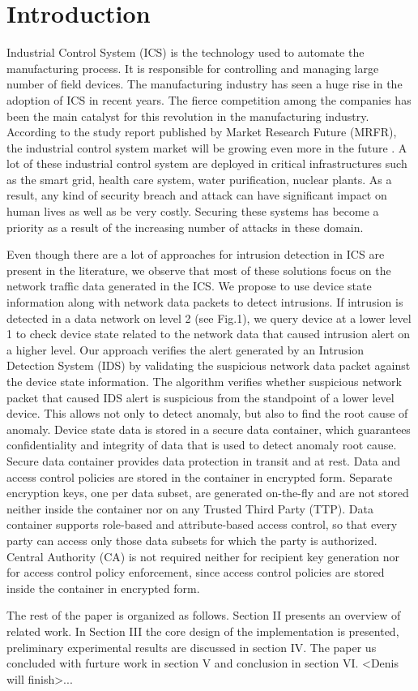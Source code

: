 \documentclass[conference]{IEEEtran}
\begin{document}
\section{Introduction}
Industrial Control System (ICS) is the technology used to automate the manufacturing process. It is responsible for controlling and managing large number of field devices. The manufacturing industry has seen a huge rise in the adoption of ICS in recent years. The fierce competition among the companies has been the main catalyst for this revolution in the manufacturing industry. According to the study report published by  Market Research Future (MRFR), the industrial control system market will be growing even more in the future \cite{c1}. A lot of these industrial control system are deployed in critical infrastructures such as the smart grid, health care system, water purification, nuclear plants. As a result, any kind of security breach and attack can have significant impact on human lives as well as be very costly. Securing these systems has become a priority as a result of the increasing number of attacks in these domain. 
\par Even though there are a lot of approaches for intrusion detection in ICS are present in the literature, we observe that most of these solutions focus on the network traffic data generated in the ICS. We propose to use device state information along with network data packets to detect intrusions. If intrusion is detected in a data network on level 2 (see Fig.1), we query device at a lower level 1 to check  device state related to the network data that caused intrusion alert on a higher level. Our approach verifies the alert generated by an Intrusion Detection System (IDS) by validating the suspicious network data packet against the device state information. The algorithm verifies whether suspicious network packet that caused IDS alert is suspicious from the standpoint of a lower level device. This allows not only to detect anomaly, but also to find the root cause of anomaly. Device state data is stored in a secure data container, which guarantees confidentiality and integrity of data that is used to detect anomaly root cause. Secure data container provides data protection in transit and at rest. Data and access control policies are stored in the container in encrypted form. Separate encryption keys, one per data subset, are generated on-the-fly and are not stored neither inside the container nor on any Trusted Third Party (TTP). Data container supports role-based and attribute-based access control, so that every party can access only those data subsets for which the party is authorized. Central Authority (CA) is not required neither for recipient key generation nor for access control policy enforcement, since access control policies are stored inside the container in encrypted form.      
\par The rest of the paper is organized as follows. Section II presents an overview of related work. In Section III the core design of the implementation is presented, preliminary experimental results are discussed in section IV. The paper us concluded with furture work in section V and conclusion in section VI. <Denis will finish>... 
\end{document}
